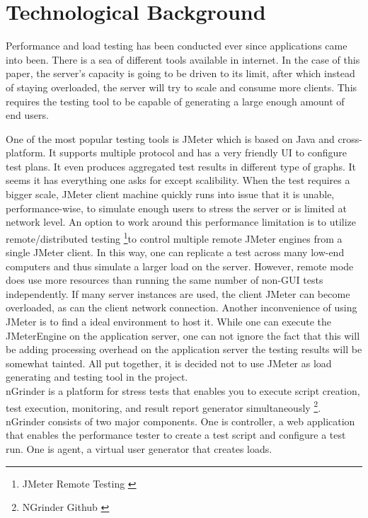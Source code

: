 \chapter{Technological Background}
\label{technological background}
Performance and load testing has been conducted ever since applications came into been. There is a sea of different tools available in internet. In the case of this paper, the server's capacity is going to be driven to its limit, after which instead of staying overloaded, the server will try to scale and consume more clients. This requires the testing tool to be capable of generating a large enough amount of end users. 

One of the most popular testing tools is JMeter which is based on Java and cross-platform. It supports multiple protocol and has a very friendly UI to configure test plans. It even produces aggregated test results in different type of graphs. It seems it has everything one asks for except scalibility. When the test requires a bigger scale, JMeter client machine quickly runs into issue that it is unable, performance-wise, to simulate enough users to stress the server or is limited at network level. An option to work around this performance limitation is to utilize remote/distributed testing \footnote{JMeter Remote Testing \cite{JMeterRemote}}to control multiple remote JMeter engines from a single JMeter client. In this way, one can replicate a test across many low-end computers and thus simulate a larger load on the server. However, remote mode does use more resources than running the same number of non-GUI tests independently. If many server instances are used, the client JMeter can become overloaded, as can the client network connection. Another inconvenience of using JMeter is to find a ideal environment to host it. While one can execute the JMeterEngine on the application server, one can not ignore the fact that this will be adding processing overhead on the application server the testing results will be somewhat tainted. All put together, it is decided not to use JMeter as load generating and testing tool in the project. \\
nGrinder is a platform for stress tests that enables you to execute script creation, test execution, monitoring, and result report generator simultaneously \footnote{NGrinder Github \cite{NGrinder}}. nGrinder consists of two major components. One is  controller, a web application that enables the performance tester to create a test script and configure a test run. One is agent, a virtual user generator that creates loads.
